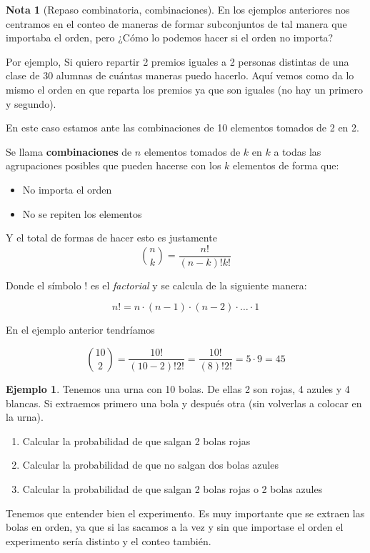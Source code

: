 \documentclass[]{book}
\theoremstyle{plain}
\theoremstyle{definition}
\newtheorem{note}[theorem]{Nota}
\newtheorem{example}[theorem]{Ejemplo}
\begin{document}
\begin{note}[Repaso combinatoria, combinaciones]

En los ejemplos anteriores nos centramos en el conteo de maneras de formar subconjuntos de tal manera que importaba el orden, pero ¿Cómo lo podemos hacer si el orden no importa?

Por ejemplo, Si quiero repartir 2 premios iguales a 2 personas distintas de una clase de 30 alumnas de cuántas maneras puedo hacerlo. 
Aquí vemos como  da lo mismo el orden en que reparta los premios ya que son iguales (no hay un primero y segundo).

En este caso estamos ante las combinaciones de 10 elementos tomados de 2 en 2.

Se llama \textbf{combinaciones} de $n$ elementos tomados de  $k$ en $k$
a todas las agrupaciones posibles que pueden hacerse con los 
$k$ elementos de forma que:
\begin{itemize}
  \item No importa el orden
  \item No se repiten los elementos
\end{itemize}

Y el total de formas de hacer esto es justamente
\[{n \choose k} = \frac{n!}{(n-k)! k!}\]

Donde el símbolo $!$ es el \emph{factorial} y se calcula de la siguiente manera:

\[n! = n \cdot (n-1) \cdot (n-2) \cdot \ldots \cdot 1\]

En el ejemplo anterior tendríamos 

\[{10 \choose 2} = \frac{10!}{(10-2)! 2!} = \frac{10!}{(8)! 2!} = 5\cdot 9 = 45\]


\begin{example}
  Tenemos una urna con 10 bolas. De ellas 2 son rojas, 4 azules y 4 blancas. Si extraemos primero una bola y después otra (sin volverlas a colocar en la urna).
  \begin{enumerate}[(1)]
    \item Calcular la probabilidad de que salgan 2 bolas rojas
    \item Calcular la probabilidad de que no salgan dos bolas azules
    \item Calcular la probabilidad de que salgan 2 bolas rojas o 2 bolas azules
  \end{enumerate}

  Tenemos que entender bien el experimento. Es muy importante que se extraen las bolas en orden, ya que si las sacamos a la vez 
  y sin que importase el orden el experimento sería distinto y el conteo también.


\end{example}
\end{note}
\end{document}
